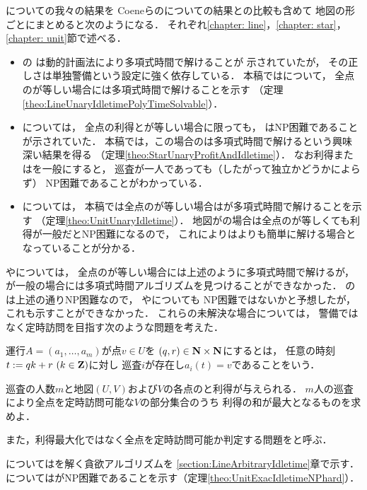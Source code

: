 {\patProb}についての我々の結果を
Coeneらの{\independentPatProb}についての結果との比較も含めて
地図の形ごとにまとめると次のようになる．
それぞれ\ref{chapter: line}，\ref{chapter: star}，\ref{chapter: unit}節で述べる．
\begin{itemize}
\item 
  {\graphLine}の
  {\independentPatProb}は動的計画法により多項式時間で解けることが
  示されていた\cite[Theorem~11]{coene2011charlemagne}が，
  その正しさは単独警備という設定に強く依存している．
  本稿では{\patProb}について，
  全点の{\maxIdletime}が等しい場合には多項式時間で解けることを示す
  （定理\ref{theo:LineUnaryIdletimePolyTimeSolvable}）．
\item
  {\graphStar}については，
  全点の利得と{\maxIdletime}が等しい場合に限っても，
  {\independentPatProb}はNP困難であることが示されていた\cite[Theorem~10]{coene2011charlemagne}．
  本稿では，この場合の{\patProb}は多項式時間で解けるという興味深い結果を得る
  （定理\ref{theo:StarUnaryProfitAndIdletime}）．
  なお利得または{\maxIdletime}を一般にすると，
  巡査が一人であっても（したがって独立かどうかによらず）
  NP困難であることがわかっている\cite[Theorems 5 and 6]{coene2011charlemagne}．
\item 
  {\graphUnit}については，
  本稿では全点の{\maxIdletime}が等しい場合は{\patProb}が多項式時間で解けることを示す
  （定理\ref{theo:UnitUnaryIdletime}）．
  地図が{\graphStar}の場合は全点の{\maxIdletime}が等しくても利得が一般だとNP困難になるので，
  これにより{\graphUnit}は{\graphStar}よりも簡単に解ける場合となっていることが分かる．
\end{itemize}

{\graphLine}や{\graphUnit}については，
全点の{\maxIdletime}が等しい場合には上述のように多項式時間で解けるが，
{\maxIdletime}が一般の場合には多項式時間アルゴリズムを見つけることができなかった．
{\graphStar}の{\patProb}は上述の通りNP困難なので\cite{coene2011charlemagne}，
{\graphLine}や{\graphUnit}についても
NP困難ではないかと予想したが，これも示すことができなかった．
これらの未解決な場合については，
警備ではなく定時訪問を目指す次のような問題を考えた．

運行$A = (a _1, \ldots, a _m)$が点$v \in U$を
{\exactTime}$(q, r) \in \mathbf N \times \mathbf N$にするとは，
任意の時刻$t := q k + r\ (k \in \mathbf Z)$に対し
巡査$i$が存在し$a _i (t) = v$であることをいう．

\begin{timeSpecifiedPatrollingProblem}
  巡査の人数$m$と地図$(U, V)$および$V$の各点の{\exactTime}と利得が与えられる．
  $m$人の巡査により全点を定時訪問可能な$V$の部分集合のうち
  利得の和が最大となるものを求めよ．
\end{timeSpecifiedPatrollingProblem}

また，利得最大化ではなく全点を定時訪問可能か判定する問題を{\timeSpecifiedPatProbDecision}と呼ぶ．


{\graphLine}については{\timeSpecifiedPatProbDecision}を解く貪欲アルゴリズムを
\ref{section:LineArbitraryIdletime}章で示す．
{\graphUnit}については{\timeSpecifiedPatProb}がNP困難であることを示す（定理\ref{theo:UnitExacIdletimeNPhard}）．
